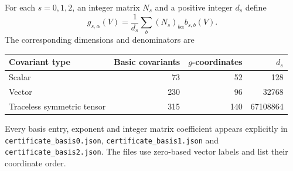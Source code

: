 \documentclass[11pt,a4paper]{article}
\theoremstyle{remark}\newtheorem{remark}[theorem]{Remark}
\begin{document}
For each $s=0,1,2$, an integer matrix $N_s$ and a positive integer $d_s$ define
\[
 g_{s,\alpha}(V)=\frac1{d_s}\sum_b (N_s)_{b\alpha}b_{s,b}(V).
\]
The corresponding dimensions and denominators are
\begin{center}
\begin{tabular}{lrrr}
\toprule
Covariant type & Basic covariants & $g$-coordinates & $d_s$\\
\midrule
Scalar &73&52&128\\
Vector &230&96&32768\\
Traceless symmetric tensor &315&140&67108864\\
\bottomrule
\end{tabular}
\end{center}
Every basis entry, exponent and integer matrix coefficient appears explicitly in \nolinkurl{certificate_basis0.json}, \nolinkurl{certificate_basis1.json} and \nolinkurl{certificate_basis2.json}. The files use zero-based vector labels and list their coordinate order.
\end{document}
